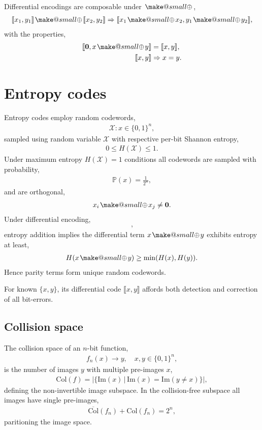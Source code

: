 \documentclass[twocolumn, aps, amsmath, amssymb, nofootinbib, superscriptaddress, longbibliography, doublefloatfix, table-of-contents, eqsecnum, rmp]{revtex4-2}
\makeatletter
\def\zerovec{\mathbf{0}}
\def\diff#1#2{\llbracket #1,#2\rrbracket}
\newcommand{\soplus}{{{\hspace{1pt}}{\mathbin{\mathpalette\make@small{\mathbin\oplus}}}}{\hspace{1pt}}}
\newcommand{\make@small}[2]{%
  \vcenter{\hbox{%
    \scalebox{0.6}{$\m@th#1#2$}%
  }}%
}
\makeatother
\begin{document}
Differential encodings are composable under $\soplus$,
\begin{align}
	\diff{x_1}{y_1} \soplus \diff{x_2}{y_2} \Rightarrow \diff{x_1\soplus x_2}{y_1 \soplus y_2},
\end{align}
with the properties,
\begin{align}
	\diff{\zerovec}{x\soplus y} &= \diff{x}{y}, \nonumber\\
	\diff{x}{y} &\Rightarrow x=y.
\end{align}

\section{Entropy codes}

Entropy codes employ random codewords,
\begin{align}
	\mathcal{X}: x \in \{0,1\}^n,
\end{align}
sampled using random variable $\mathcal{X}$ with respective per-bit Shannon entropy,
\begin{align}
	0\leq H(\mathcal{X})\leq 1.
\end{align}
Under maximum entropy $H(\mathcal{X})=1$ conditions all codewords are sampled with probability,
\begin{align}
	\mathbb{P}(x) = \frac{1}{2^n},	
\end{align}
and are orthogonal,
\begin{align}
	x_i \soplus x_j \neq \mathbf{0}.
\end{align}
Under differential encoding,
\begin{align}
	[x,x\soplus y],
\end{align}
entropy addition implies the differential term $x\soplus y$ exhibits entropy at least,
\begin{align}
	H(x\soplus y) \geq \min(H(x),H(y)).
\end{align}
Hence parity terms form unique random codewords.

For known $\{x,y\}$, its differential code $\diff{x}{y}$ affords both detection and correction of all bit-errors.

\subsection{Collision space}

The collision space of an $n$-bit function,
\begin{align}
	f_n(x) \to y,\quad x,y\in\{0,1\}^n,
\end{align}
is the number of images $y$ with multiple pre-images $x$,
\begin{align}
	\mathrm{Col}(f) = |\{\mathrm{Im}(x)\,|\,\mathrm{Im}(x)=\mathrm{Im}(y\neq x)\}|,
\end{align}
defining the non-invertible image subspace. In the collision-free subspace all images have single pre-images,
\begin{align}
	\overline{\mathrm{Col}}(f_n) + \mathrm{Col}(f_n) = 2^n,
\end{align}
paritioning the image space.
\end{document}
